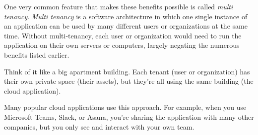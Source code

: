 


One very common feature that makes these benefits possible is called \textit{multi tenancy}.
\textit{Multi tenancy} is a software architecture in which one single instance of an application
can be used by many different users or organizations at the same time.
Without multi-tenancy, each user or organization would need to run the application on
their own servers or computers,
largely negating the numerous benefits listed earlier.


Think of it like a big apartment building. Each tenant (user or organization) has their
own private space (their assets), but they're all using the same building (the
cloud application).

Many popular cloud applications use this approach. For example, when you use Microsoft Teams,
Slack, or Asana, you're sharing the application with many other companies, but you only
see and interact with your own team.


